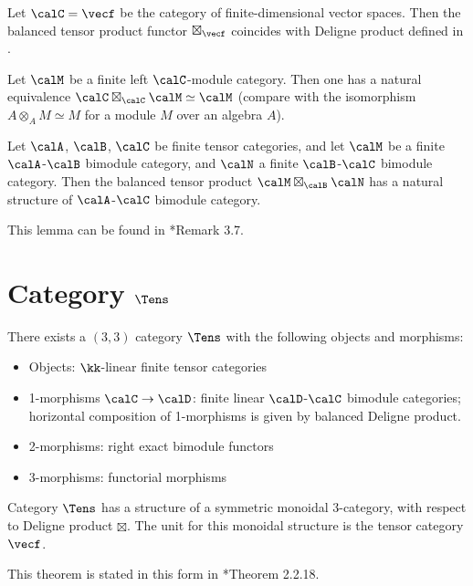 \begin{example}\label{x:vecf-modules}
  Let $\calC=\vecf$ be the category of finite-dimensional vector spaces.
  Then the balanced tensor product functor $\boxtimes_{\vecf}$ coincides with
  Deligne product defined in .
\end{example}

\begin{example}\label{x:module-dual-category}
  Let $\calM$ be a finite left $\calC$-module category. Then one has a natural
  equivalence $\calC\boxtimes_\calC \calM\simeq \calM$ (compare with the isomorphism
  $A\otimes_A M\simeq M$ for a module $M$ over an algebra $A$).
\end{example}

\begin{lemma}\label{l:bimodule-composition}
  Let $\calA$, $\calB$, $\calC$ be finite tensor categories, and let
  $\calM$ be a finite $\calA$-$\calB$ bimodule category, and $\calN$ a finite
  $\calB$-$\calC$ bimodule category. Then the balanced tensor product
  $\calM\boxtimes_{\calB} \calN$ has a natural structure of $\calA$-$\calC$
  bimodule category.
\end{lemma}
This lemma can be found in *{Remark 3.7}.

\section{Category $\Tens$}\label{s:tens-category}

\begin{theorem}\label{t:tens-exists}
  There exists a $(3, 3)$ category $\Tens$ with the following objects and
  morphisms:
  \begin{itemize}
    \item Objects: $\kk$-linear finite tensor categories
    \item 1-morphisms $\calC\to\calD$: finite linear $\calD$-$\calC$ bimodule
      categories; horizontal composition of
      1-morphisms is given by balanced Deligne product.
    \item 2-morphisms: right exact bimodule functors
    \item 3-morphisms: functorial morphisms
  \end{itemize}
  Category
  $\Tens$ has a structure of a symmetric monoidal 3-category, with respect
  to Deligne product $\boxtimes$. The unit for this monoidal structure is the
  tensor category $\vecf$.
\end{theorem}
This theorem is stated in this form in
*{Theorem 2.2.18}.

